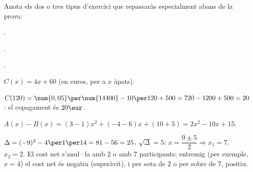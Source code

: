 \noindent Anota els dos o tres tipus d'exercici que repassaràs
especialment abans de la prova:

\medskip
{}.\ \dotfill

.\ \dotfill

.\ \dotfill

\begin{solucions}
\begin{sollist}
  \item $C(x)=4x+60$ (en euros, per a $x$ àpats).
  \item $C(120)=\num{0,05}\per\num{14400}-10\per120+500=720-1200+500=20$:
        el copagament és $20\eur$.
  \item $A(x)-B(x)=(3-1)x^2+(-4-6)x+(10+5)=2x^2-10x+15$.
  \item $\Delta=(-9)^2-4\per1\per14=81-56=25$, $\sqrt{\Delta}=5$;
        $x=\dfrac{9\pm5}{2} \Rightarrow x_1=7$, $x_2=2$. El cost net
        s'anul·la amb $2$ o amb $7$ participants; entremig (per exemple,
        $x=4$) el cost net és negatiu (superàvit), i per sota de $2$ o
        per sobre de $7$, positiu.
\end{sollist}
\end{solucions}
